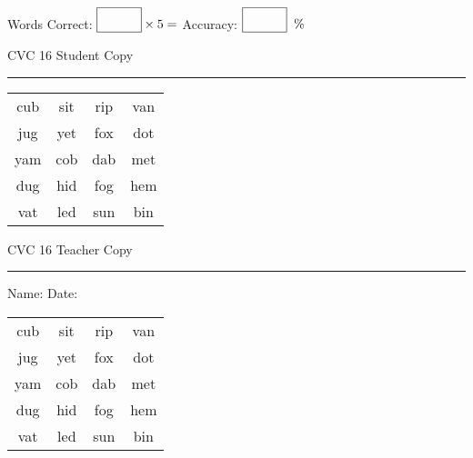 \documentclass{memoir}
\begin{document}
\normalsize

Words Correct: $\fbox{\phantom{\huge 100}} \times 5 = $ Accuracy: $\fbox{\phantom{\huge 100}}\;\; \%$ 

\vfill

\newpage


\footnotesize \noindent
CVC 16 \hfill Student Copy
\smallskip
\hrule

\huge

\setlength{\tabcolsep}{14pt}
\def\arraystretch{2}

{\selectfont


\begin{vplace}[0.5]
\begin{center}
\begin{tabular}{cccc}
cub & sit & rip & van \\
jug & yet & fox & dot \\
yam & cob & dab & met \\
dug & hid & fog & hem \\
vat & led & sun & bin \\
\end{tabular}
\end{center}
\end{vplace}

}

\newpage

\footnotesize \noindent
CVC 16 \hfill Teacher Copy
\smallskip
\hrule

\normalsize

\vfill

\noindent
Name: \underline{\hspace{1.75in}} \hfill Date: \underline{\hspace{1in}}

\huge

{\selectfont


\begin{vplace}[0.5]
\begin{center}
\begin{tabular}{cccc}
cub & sit & rip & van \\
jug & yet & fox & dot \\
yam & cob & dab & met \\
dug & hid & fog & hem \\
vat & led & sun & bin \\
\end{tabular}
\end{center}
\end{vplace}



}
\end{document}
